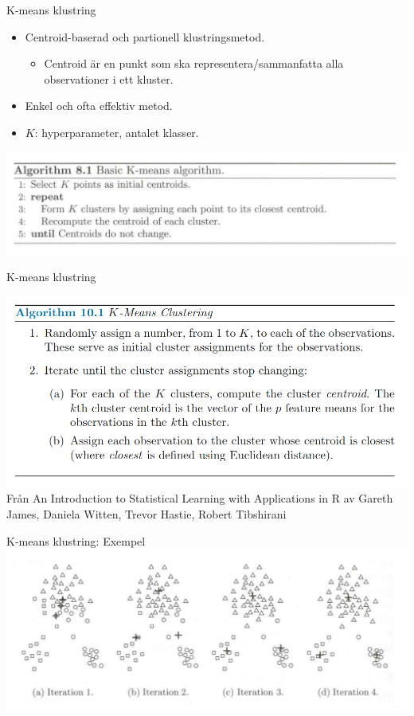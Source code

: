 \documentclass[10pt,english]{beamer}
\begin{document}
\begin{frame}{K-means klustring}

    \begin{itemize}
        \item Centroid-baserad och partionell klustringsmetod.
        \begin{itemize}
            \item Centroid är en punkt som ska representera/sammanfatta alla observationer i ett kluster.
        \end{itemize}
        \item Enkel och ofta effektiv metod.
        \item $K$: hyperparameter, antalet klasser.
    \end{itemize}

    \includegraphics[width=\textwidth]{figs/basic K-means.png}
    
\end{frame}

\begin{frame}{K-means klustring}

    \includegraphics[width=\textwidth]{figs/K-means clustering.png}
    Från An Introduction to Statistical Learning with Applications in R av Gareth James, Daniela Witten, Trevor
Hastie, Robert Tibshirani
    
\end{frame}

\begin{frame}{K-means klustring: Exempel}
    \includegraphics[width=1.1\textwidth]{figs/k-means Illustration1.png}
\end{frame}
\end{document}
